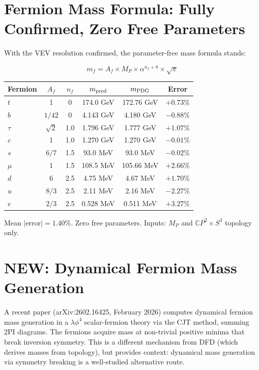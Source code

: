 \documentclass[11pt,a4paper]{article}
\newcommand{\NEW}{\textcolor{dfdblue}{\textbf{NEW}}}
\newcommand{\CP}{\mathbb{C}P}
\begin{document}
\section{Fermion Mass Formula: Fully Confirmed, Zero Free Parameters}

With the VEV resolution confirmed, the parameter-free mass formula stands:

\begin{equation}
\boxed{m_f = A_f \times M_P \times \alpha^{n_f + 8} \times \sqrt{\pi}}
\end{equation}

\begin{center}
\begin{tabular}{lccccc}
\toprule
Fermion & $A_f$ & $n_f$ & $m_{\rm pred}$ & $m_{\rm PDG}$ & Error \\
\midrule
$t$ & 1 & 0 & 174.0 GeV & 172.76 GeV & $+0.73\%$ \\
$b$ & $1/42$ & 0 & 4.143 GeV & 4.180 GeV & $-0.88\%$ \\
$\tau$ & $\sqrt{2}$ & 1.0 & 1.796 GeV & 1.777 GeV & $+1.07\%$ \\
$c$ & 1 & 1.0 & 1.270 GeV & 1.270 GeV & $-0.01\%$ \\
$s$ & $6/7$ & 1.5 & 93.0 MeV & 93.0 MeV & $-0.02\%$ \\
$\mu$ & 1 & 1.5 & 108.5 MeV & 105.66 MeV & $+2.66\%$ \\
$d$ & 6 & 2.5 & 4.75 MeV & 4.67 MeV & $+1.70\%$ \\
$u$ & $8/3$ & 2.5 & 2.11 MeV & 2.16 MeV & $-2.27\%$ \\
$e$ & $2/3$ & 2.5 & 0.528 MeV & 0.511 MeV & $+3.27\%$ \\
\bottomrule
\end{tabular}
\end{center}

Mean $|$error$| = 1.40\%$. Zero free parameters. Inputs: $M_P$ and $\CP^2 \times S^3$ topology only.

\section{\NEW: Dynamical Fermion Mass Generation}

A recent paper (arXiv:2602.16425, February 2026) computes dynamical fermion mass generation in a $\lambda \phi^4$ scalar-fermion theory via the CJT method, summing 2PI diagrams. The fermions acquire mass at non-trivial positive minima that break inversion symmetry. This is a different mechanism from DFD (which derives masses from topology), but provides context: dynamical mass generation via symmetry breaking is a well-studied alternative route.
\end{document}
